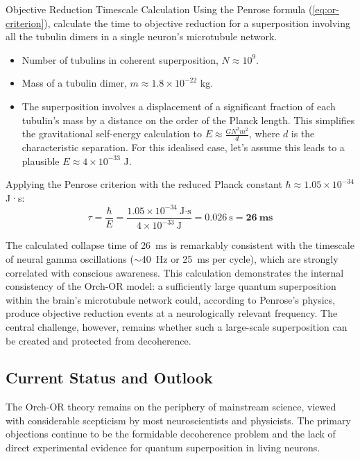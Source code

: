 \begin{workedexample}{Objective Reduction Timescale Calculation}
     Using the Penrose formula (\cref{eq:or-criterion}), calculate the time to objective reduction for a superposition involving all the tubulin dimers in a single neuron's microtubule network.
    
    \begin{itemize}
        \item Number of tubulins in coherent superposition, \(N \approx 10^9\).
        \item Mass of a tubulin dimer, \(m \approx 1.8 \times 10^{-22}\) kg.
        \item The superposition involves a displacement of a significant fraction of each tubulin's mass by a distance on the order of the Planck length. This simplifies the gravitational self-energy calculation to \(E \approx \frac{G N^2 m^2}{d}\), where \(d\) is the characteristic separation. For this idealised case, let's assume this leads to a plausible \(E \approx 4 \times 10^{-33}\) J.
    \end{itemize}
    
    Applying the Penrose criterion with the reduced Planck constant \(\hbar \approx 1.05 \times 10^{-34}\) J·s:
    \[
    \tau = \frac{\hbar}{E} = \frac{1.05 \times 10^{-34}~\text{J·s}}{4 \times 10^{-33}~\text{J}} = 0.026~\text{s} = \mathbf{26~\text{ms}}
    \]
    
     The calculated collapse time of 26~ms is remarkably consistent with the timescale of neural gamma oscillations (\(\sim\)40~Hz or 25~ms per cycle), which are strongly correlated with conscious awareness. This calculation demonstrates the internal consistency of the Orch-OR model: a sufficiently large quantum superposition within the brain's microtubule network could, according to Penrose's physics, produce objective reduction events at a neurologically relevant frequency. The central challenge, however, remains whether such a large-scale superposition can be created and protected from decoherence.
\end{workedexample}

\subsection{Current Status and Outlook}

The Orch-OR theory remains on the periphery of mainstream science, viewed with considerable scepticism by most neuroscientists and physicists. The primary objections continue to be the formidable decoherence problem and the lack of direct experimental evidence for quantum superposition in living neurons.

